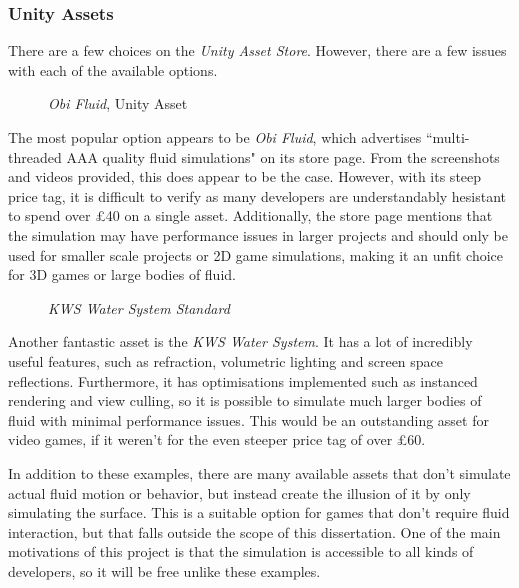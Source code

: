 \documentclass[12pt]{article}
\newcommand{\wideimage}[2][]{%
  \makebox[\textwidth][c]{\texttt{[image: \#2]}}%
}
\begin{document}
    \subsubsection{Unity Assets}

    There are a few choices on the \textit{Unity Asset Store}\cite{unityasset}. However, there are a few issues with each of the available options.

    \begin{figure}[H]
        \noindent\wideimage[]{obiFluid.png}
        \caption{\textit{Obi Fluid}, Unity Asset \cite{obi}}
    \end{figure}

    The most popular option appears to be \textit{Obi Fluid}, which advertises ``multi-threaded AAA quality fluid simulations" on its store page. From the screenshots and videos provided, this does appear to be the case. However, with its steep price tag, it is difficult to verify as many developers are understandably hesistant to spend over £40 on a single asset. Additionally, the store page mentions that the simulation may have performance issues in larger projects and should only be used for smaller scale projects or 2D game simulations, making it an unfit choice for 3D games or large bodies of fluid.

    \begin{figure}[H]
        \noindent\wideimage[]{KWS.png}
        \caption{\textit{KWS Water System Standard} \cite{kws}}
    \end{figure}

    Another fantastic asset is the \textit{KWS Water System}. It has a lot of incredibly useful features, such as refraction, volumetric lighting and screen space reflections. Furthermore, it has optimisations implemented such as instanced rendering and view culling, so it is possible to simulate much larger bodies of fluid with minimal performance issues. This would be an outstanding asset for video games, if it weren't for the even steeper price tag of over £60.

    In addition to these examples, there are many available assets that don't simulate actual fluid motion or behavior, but instead create the illusion of it by only simulating the surface. This is a suitable option for games that don't require fluid interaction, but that falls outside the scope of this dissertation. One of the main motivations of this project is that the simulation is accessible to all kinds of developers, so it will be free unlike these examples.
    
\end{document}
